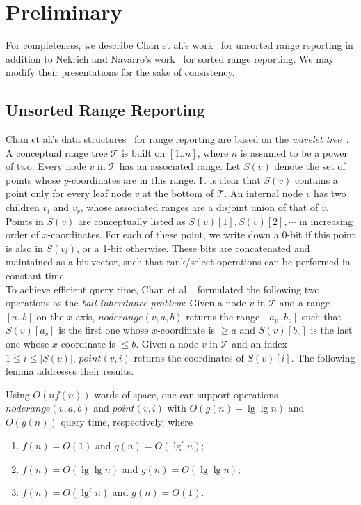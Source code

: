 \documentclass{llncs}
\begin{document}
\section{Preliminary}
\label{section_preliminary}

For completeness, we describe Chan et al.'s work~\cite{DBLP:conf/compgeom/ChanLP11} for unsorted range reporting
in addition to Nekrich and Navarro's work~\cite{DBLP:conf/swat/NekrichN12} for sorted range reporting.
We may modify their presentations for the sake of consistency.

\subsection{Unsorted Range Reporting}
\label{subsection_unsorted}

Chan et al.'s data structures~\cite{DBLP:conf/compgeom/ChanLP11} for range reporting
are based on the \emph{wavelet tree}~\cite{DBLP:journals/siamcomp/Chazelle88,DBLP:conf/soda/GrossiGV03}.
A conceptual range tree $\mathcal T$ is built on $[1..n]$, where $n$ is assumed to be a power of two.
Every node $v$ in $\mathcal T$ has an associated range.
Let $S(v)$ denote the set of points whose $y$-coordinates are in this range.
It is clear that $S(v)$ contains a point only for every leaf node $v$ at the bottom of $\mathcal T$.
An internal node $v$ has two children $v_l$ and $v_r$, whose associated ranges are a disjoint union of that of $v$.
Points in $S(v)$ are conceptually listed as $S(v)[1], S(v)[2], \cdots$ in increasing order of $x$-coordinates.
For each of these point, we write down a 0-bit if this point is also in $S(v_l)$, or a 1-bit otherwise.
These bits are concatenated and maintained as a bit vector,
such that rank/select operations can be performed in constant time~\cite{DBLP:conf/soda/ClarkM96}. \\
\indent To achieve efficient query time,
Chan et al.~\cite{DBLP:conf/compgeom/ChanLP11} formulated the following two operations as the \emph{ball-inheritance problem}:
Given a node $v$ in $\mathcal T$ and a range $[a..b]$ on the $x$-axis,
$noderange(v, a, b)$ returns the range $[a_v..b_v]$ such that
$S(v)[a_v]$ is the first one whose $x$-coordinate is $\geq a$
and $S(v)[b_v]$ is the last one whose $x$-coordinate is $\leq b$.
Given a node $v$ in $\mathcal T$ and an index $1 \leq i \leq |S(v)|$,
$point(v, i)$ returns the coordinates of $S(v)[i]$.
The following lemma addresses their results.
\begin{lemma}
    \label{lemma_ball_inheritance}
    Using $O(nf(n))$ words of space,
    one can support operations $noderange(v, a, b)$ and $point(v, i)$ with $O(g(n) + \lg\lg n)$ and $O(g(n))$ query time, respectively,
    where
    \begin{enumerate}
        \item $f(n) = O(1)$ and $g(n) = O(\lg^\epsilon n)$;
        \item $f(n) = O(\lg\lg n)$ and $g(n) = O(\lg\lg n)$;
        \item $f(n) = O(\lg^\epsilon n)$ and $g(n) = O(1)$.
    \end{enumerate}
\end{lemma}
\end{document}
